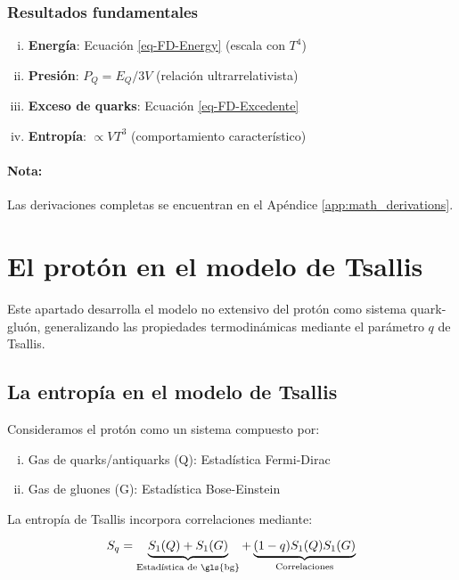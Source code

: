 \subsubsection*{Resultados fundamentales}
\begin{enumerate}[i.]
    \item \textbf{Energía}: Ecuación \eqref{eq-FD-Energy} (escala con $T^4$)
    \item \textbf{Presión}: $P_Q = E_Q/3V$ (relación ultrarrelativista)
    \item \textbf{Exceso de quarks}: Ecuación \eqref{eq-FD-Excedente}
    \item \textbf{Entropía}: $\propto V T^3$ (comportamiento característico)
\end{enumerate}

\paragraph{Nota:} Las derivaciones completas se encuentran en el Apéndice \ref{app:math_derivations}.

\section{El protón en el modelo de Tsallis}

Este apartado desarrolla el modelo no extensivo del protón como sistema quark-gluón, generalizando las propiedades termodinámicas mediante el parámetro $q$ de Tsallis.

\subsection{La entropía en el modelo de Tsallis}

Consideramos el protón como un sistema compuesto por:

\begin{enumerate}[i.]
    \item Gas de quarks/antiquarks (Q): Estadística Fermi-Dirac
    \item Gas de gluones (G): Estadística Bose-Einstein
\end{enumerate}

La entropía de Tsallis incorpora correlaciones mediante:

\begin{equation}\label{eq-Entropy-Tsallis}
{S}_{q} = \underbrace{{S}_{1}(Q) + {S}_{1}(G)}_{\text{Estadística de \gls{bg}}} + \underbrace{(1-q){S}_{1}(Q){S}_{1}(G)}_{\text{Correlaciones}}
\end{equation}

